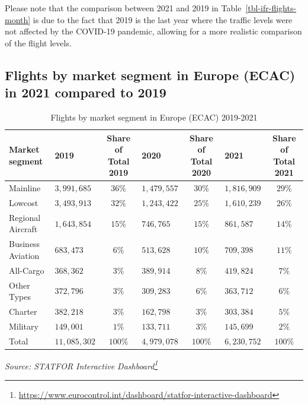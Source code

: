 \documentclass[
  11pt,
  a4paper,
]{book}
\DeclareRobustCommand{\href}[2]{#2\footnote{\url{#1}}}
\begin{document}
Please note that the comparison between 2021 and 2019 in
Table~\ref{tbl-ifr-flights-month} is due to the fact that 2019 is the
last year where the traffic levels were not affected by the COVID-19
pandemic, allowing for a more realistic comparison of the flight levels.

\hypertarget{flights-by-market-segment-in-europe-ecac-in-2021-compared-to-2019}{%
\subsection{Flights by market segment in Europe (ECAC) in 2021 compared
to
2019}\label{flights-by-market-segment-in-europe-ecac-in-2021-compared-to-2019}}

\hypertarget{tbl-flights-per-market-segment}{}
\setlength{\LTpost}{0mm}
\begin{longtable}{llclclc}
\caption{\label{tbl-flights-per-market-segment}Flights by market segment in Europe (ECAC) 2019-2021 }\tabularnewline

\toprule
Market segment & 2019 & Share of Total 2019 & 2020 & Share of Total 2020 & 2021 & Share of Total 2021 \\ 
\midrule
Mainline & $3,991,685$ & $36\%$ & $1,479,557$ & $30\%$ & $1,816,909$ & $29\%$ \\ 
Lowcost & $3,493,913$ & $32\%$ & $1,243,422$ & $25\%$ & $1,610,239$ & $26\%$ \\ 
Regional Aircraft & $1,643,854$ & $15\%$ & $746,765$ & $15\%$ & $861,587$ & $14\%$ \\ 
Business Aviation & $683,473$ & $6\%$ & $513,628$ & $10\%$ & $709,398$ & $11\%$ \\ 
All-Cargo & $368,362$ & $3\%$ & $389,914$ & $8\%$ & $419,824$ & $7\%$ \\ 
Other Types & $372,796$ & $3\%$ & $309,283$ & $6\%$ & $363,712$ & $6\%$ \\ 
Charter & $382,218$ & $3\%$ & $162,798$ & $3\%$ & $303,384$ & $5\%$ \\ 
Military & $149,001$ & $1\%$ & $133,711$ & $3\%$ & $145,699$ & $2\%$ \\ 
Total & $11,085,302$ & $100\%$ & $4,979,078$ & $100\%$ & $6,230,752$ & $100\%$ \\ 
\bottomrule
\end{longtable}
\begin{minipage}{\linewidth}
\emph{Source: \href{https://www.eurocontrol.int/dashboard/statfor-interactive-dashboard}{STATFOR Interactive Dashboard}}\\
\end{minipage}
\end{document}
